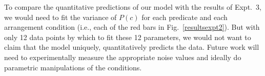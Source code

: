 \documentclass[preprint,12pt,authoryear,titlepage]{elsarticle}
\newcommand{\ndg}[1]{\textcolor{Green}{[ndg: #1]}}
\begin{document}



To compare the quantitative predictions of our model with the results of Expt.~3, we would need to fit the variance of $P(c)$ for each predicate and each arrangement condition (i.e., each of the red bars in  Fig.~\ref{resultsexpt2}). But with only 12 data points by which to fit these 12 parameters,  %
we would not want to claim that the model uniquely, quantitatively predicts the data. Future work will need to experimentally measure the appropriate noise values and ideally do parametric manipulations of the conditions.
\end{document}
